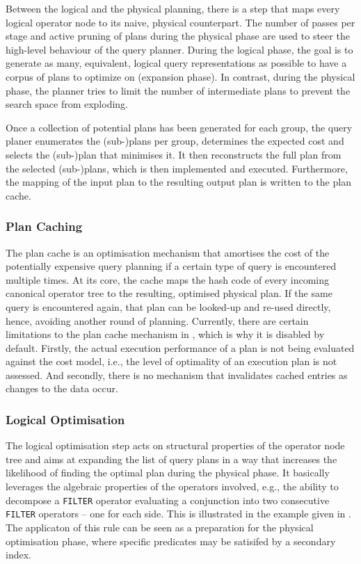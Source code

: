 Between the logical and the physical planning, there is a step that maps every logical operator node to its naive, physical counterpart. The number of passes per stage and active pruning of plans during the physical phase are used to steer the high-level behaviour of the query planner. During the logical phase, the goal is to generate as many, equivalent, logical query representations as possible to have a corpus of plans to optimize on (expansion phase). In contrast, during the physical phase, the planner tries to limit the number of intermediate plans to prevent the search space from exploding.

Once a collection of potential plans has been generated for each group, the query planer enumerates the (sub-)plans per group, determines the expected cost and selects the (sub-)plan that minimises it. It then reconstructs the full plan from the selected (sub-)plans, which is then implemented and executed. Furthermore, the mapping of the input plan to the resulting output plan is written to the plan cache.

\subsubsection{Plan Caching}

The plan cache is an optimisation mechanism that amortises the cost of the potentially expensive query planning if a certain type of query is encountered multiple times. At its core, the cache maps the hash code of every incoming canonical operator tree to the resulting, optimised physical plan. If the same query is encountered again, that plan can be looked-up and re-used directly, hence, avoiding another round of planning. Currently, there are certain limitations to the plan cache mechanism in \cottontail{}, which is why it is disabled by default. Firstly, the actual execution performance of a plan is not being evaluated against the cost model, i.e., the level of optimality of an execution plan is not assessed. And secondly, there is no mechanism that invalidates cached entries as changes to the data occur. 

\subsubsection{Logical Optimisation}

The logical optimisation step acts on structural properties of the operator node tree and aims at expanding the list of query plans in a way that increases the likelihood of finding the optimal plan during the physical phase. It basically leverages the algebraic properties of the operators involved, e.g., the ability to decompose a  \texttt{FILTER} operator evaluating a conjunction into two consecutive \texttt{FILTER} operators -- one for each side. This is illustrated in the example given in . The applicaton of this rule can be seen as a preparation for the physical optimisation phase, where specific predicates may be satisifed by a secondary index.

